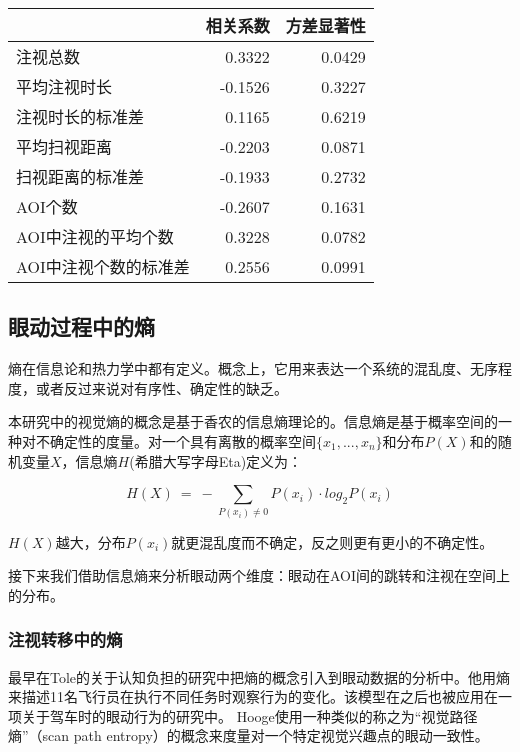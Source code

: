 \begin{table}[H]
  \centering
  \begin{tabular}{lrr}
    \hline
     &相关系数 & 方差显著性 \\
    \hline
    注视总数 & 0.3322 & 0.0429 \\
    平均注视时长 & -0.1526 & 0.3227 \\
    注视时长的标准差 & 0.1165 & 0.6219 \\
    平均扫视距离 & -0.2203 & 0.0871 \\
    扫视距离的标准差 & -0.1933 & 0.2732 \\
    AOI个数 & -0.2607 & 0.1631 \\
    AOI中注视的平均个数 & 0.3228 & 0.0782 \\
    AOI中注视个数的标准差 & 0.2556 & 0.0991 \\
    \hline
  \end{tabular}
\end{table}


\subsection{眼动过程中的熵}
熵在信息论和热力学中都有定义。概念上，它用来表达一个系统的混乱度、无序程度，或者反过来说对有序性、确定性的缺乏。

本研究中的视觉熵的概念是基于香农的信息熵理论的。信息熵是基于概率空间的一种对不确定性的度量。对一个具有离散的概率空间$\{x_1, ..., x_n\}$和分布$P(X)$和的随机变量$X$，信息熵$H$(希腊大写字母Eta)定义为：

$$H(X)~=~-\sum_{P(x_i)\neq 0} P(x_i)\cdot log_{2}P(x_i)$$

$H(X)$越大，分布$P(x_i)$就更混乱度而不确定，反之则更有更小的不确定性。

接下来我们借助信息熵来分析眼动两个维度：眼动在AOI间的跳转和注视在空间上的分布。

\subsubsection{注视转移中的熵}
最早在Tole的关于认知负担的研究中把熵的概念引入到眼动数据的分析中。他用熵来描述11名飞行员在执行不同任务时观察行为的变化。该模型在之后也被应用在一项关于驾车时的眼动行为的研究中。
Hooge使用一种类似的称之为“视觉路径熵”（scan path entropy）的概念来度量对一个特定视觉兴趣点的眼动一致性。

